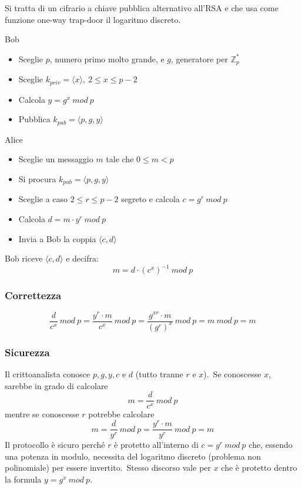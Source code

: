 Si tratta di un cifrario a chiave pubblica alternativo all'RSA e che usa come funzione one-way trap-door il logaritmo discreto.\

\vspace{12pt}
\noindent Bob
\begin{itemize}
    \item Sceglie $p$, numero primo molto grande, e $g$, generatore per $\mathbb{Z}_p^*$
    \item Sceglie $k_{\mathit{priv}} = \langle x \rangle,\ 2\leq x\leq p-2$
    \item Calcola $y=g^x\ \mathit{mod}\ p$
    \item Pubblica $k_{\mathit{pub}} = \langle p,g,y \rangle$
\end{itemize}
Alice
\begin{itemize}
    \item Sceglie un messaggio $m$ tale che $0\leq m <p$
    \item Si procura $k_{\mathit{pub}} = \langle p,g,y \rangle$
    \item Sceglie a caso $2\leq r \leq p-2$ segreto e calcola $c = g^r\ \mathit{mod}\ p$
    \item Calcola $d=m \cdot y^r\ \mathit{mod}\ p$
    \item Invia a Bob la coppia $\langle c,d \rangle$
\end{itemize}

\vspace{12pt}

\noindent Bob riceve $\langle c,d \rangle$ e decifra:\
\[m = d \cdot \left(c^x\right)^{-1}\ \mathit{mod}\ p\]

\subsubsection{Correttezza}

\[\frac{d}{c^x}\ \mathit{mod}\ p = \frac{y^r \cdot m}{c^x}\ \mathit{mod}\ p = \frac{g^{xr} \cdot m}{(g^r)^x}\ \mathit{mod}\ p = m\ \mathit{mod}\ p = m\]

\subsubsection{Sicurezza}

Il crittoanalista conosce $p, g, y, c$ e $d$ (tutto tranne $r$ e $x$).\
Se conoscesse $x$, sarebbe in grado di calcolare \[m = \frac{d}{c^x}\ \mathit{mod}\ p\] mentre se conoscesse $r$ potrebbe calcolare
\[m = \frac{d}{y^r}\ \mathit{mod}\ p = \frac{y^r \cdot m}{y^r}\ \mathit{mod}\ p = m \]
Il protocollo è sicuro perché $r$ è protetto all'interno di $c = g^r\ \mathit{mod}\ p$ che, essendo una potenza in modulo, necessita del logaritmo discreto (problema non polinomiale) per essere invertito.\
Stesso discorso vale per $x$ che è protetto dentro la formula $y = g^x\ \mathit{mod}\ p$.
